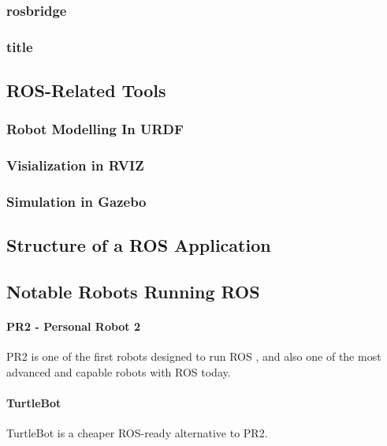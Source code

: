 \subsubsection{rosbridge}

\subsubsection{title}

\subsection{ROS-Related Tools}

\subsubsection{Robot Modelling In URDF}

\subsubsection{Visialization in RVIZ}

\subsubsection{Simulation in Gazebo}

\subsection{Structure of a ROS Application}

\subsection{Notable Robots Running ROS}

\paragraph{PR2 - Personal Robot 2}

PR2 is one of the first robots designed to run \ac{ROS} \cite{rosbook15}, and also one of the most advanced and capable robots with \ac{ROS} today. 

\paragraph{TurtleBot} 

TurtleBot is a cheaper ROS-ready alternative to PR2. 

